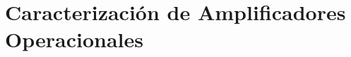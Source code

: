 








\tableofcontents
\newpage


\section{Caracterización de Amplificadores Operacionales}
	
\newpage	



